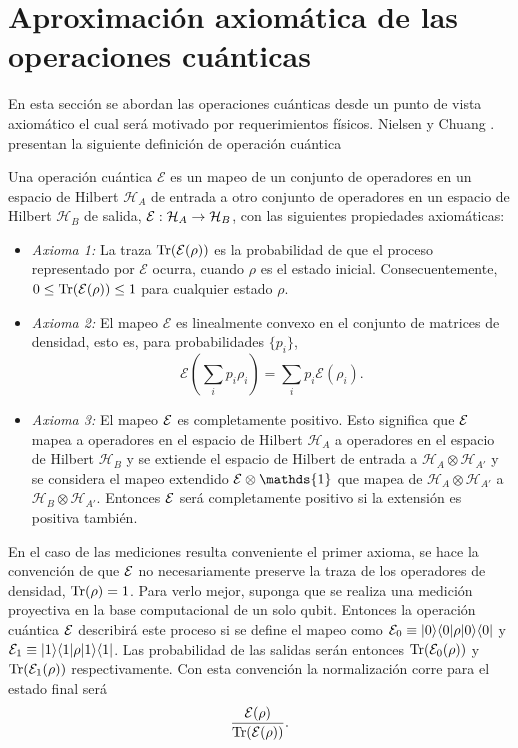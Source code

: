 \section{Aproximación axiomática de las operaciones cuánticas} %
En esta sección se abordan las operaciones cuánticas desde un punto de vista
axiomático el cual será motivado por requerimientos físicos. Nielsen y
Chuang {\cite{nielsen_chuang_2010}}.
presentan la siguiente definición de operación cuántica \begin{definition}\label{DefE(rho)} Una operación cuántica $\mathcal{E}$ es un mapeo de un conjunto de operadores en un espacio de Hilbert $\mathcal{H}_A$ de entrada a otro conjunto de operadores en un espacio de Hilbert $\mathcal{H}_B$ de salida, $\mathcal{E}: \mathcal{H}_A \rightarrow \mathcal{H}_B$, con las siguientes propiedades axiomáticas:

    \begin{itemize}
        \item \textit{Axioma 1:} La traza ${\rm Tr} (\mathcal{E}(\rho))$ es la probabilidad de que el proceso representado por $\mathcal{E}$ ocurra, cuando $\rho$ es el estado inicial. Consecuentemente, $0 \le {\rm Tr} (\mathcal{E}(\rho)) \le 1$ para cualquier estado $\rho$.
        \item \textit{Axioma 2:} El mapeo $\mathcal{E}$ es linealmente convexo en el conjunto de matrices de densidad, esto es, para probabilidades $\{p_i\}$, \[\mathcal{E}\left(\sum _i p_i \rho _i\right)=\sum_i p_i \mathcal{E}(\rho_i).\]
        \item\textit{Axioma 3:} El mapeo $\mathcal{E}$ es completamente positivo. Esto significa que $\mathcal{E}$ mapea a operadores en el espacio de Hilbert $\mathcal{H}_{A}$  a operadores en el espacio de Hilbert $\mathcal{H}_B$ y se extiende el espacio de Hilbert de entrada a $\mathcal{H}_A\otimes\mathcal{H}_{A'}$ y se considera el mapeo extendido $\E \otimes \mathds{1}$ que mapea de $\mathcal{H}_A \otimes \mathcal{H}_{A'} $ a $\mathcal{H}_B \otimes \mathcal{H}_{A'}$. Entonces  $\mathcal{E}$ será completamente positivo si la extensión es positiva también.
    \end{itemize}
\end{definition}

En el caso de las mediciones resulta conveniente el primer axioma, se hace la convención de que $\mathcal{E}$ no necesariamente preserve la traza de los operadores de densidad, ${\rm Tr}(\rho)=1$. Para verlo mejor, suponga que se realiza una medición proyectiva en la base computacional de un solo qubit. Entonces la operación cuántica $\mathcal{E}$ describirá este proceso si se define el mapeo como $\mathcal{E}_0\equiv|0\rangle \langle0|\rho |0\rangle \langle 0|$ y $\mathcal{E}_1\equiv|1\rangle \langle1|\rho |1\rangle \langle 1|$. Las probabilidad de las salidas serán entonces ${\rm Tr} (\mathcal{E}_0(\rho))$ y ${\rm Tr} (\mathcal{E}_1(\rho))$ respectivamente.  Con esta convención la normalización corre para el estado final será \[\dfrac{\mathcal{E}(\rho)}{{\rm Tr} (\mathcal{E} (\rho))}.\]

